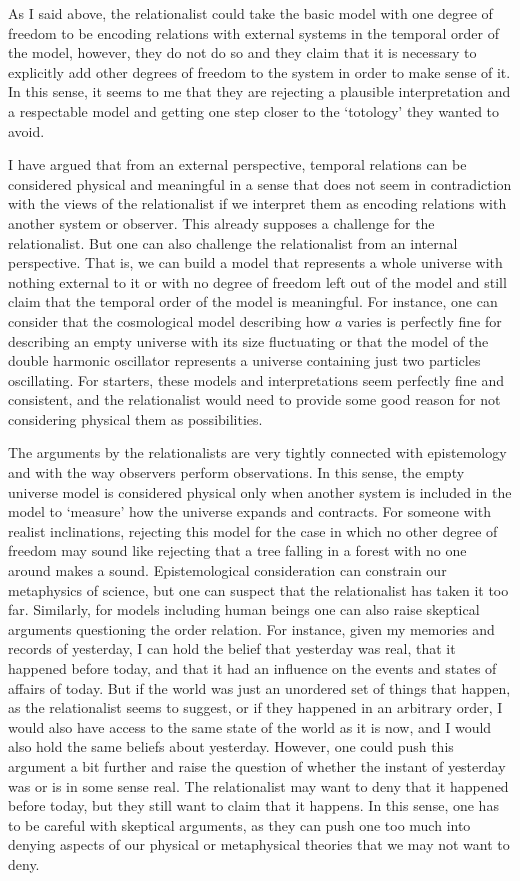 \documentclass[12 pt]{article}
\begin{document}
As I said above, the relationalist could take the basic model with one degree of freedom to be encoding relations with external systems in the temporal order of the model, however, they do not do so and they claim that it is necessary to explicitly add other degrees of freedom to the system in order to make sense of it. In this sense, it seems to me that they are rejecting a plausible interpretation and a respectable model and getting one step closer to the `totology' they wanted to avoid.

I have argued that from an external perspective, temporal relations can be considered physical and meaningful in a sense that does not seem in contradiction with the views of the relationalist if we interpret them as encoding relations with another system or observer. This already supposes a challenge for the relationalist. But one can also challenge the relationalist from an internal perspective. That is, we can build a model that represents a whole universe with nothing external to it or with no degree of freedom left out of the model and still claim that the temporal order of the model is meaningful. For instance, one can consider that the cosmological model describing how $a$ varies is perfectly fine for describing an empty universe with its size fluctuating or that the model of the double harmonic oscillator represents a universe containing just two particles oscillating. For starters, these models and interpretations seem perfectly fine and consistent, and the relationalist would need to provide some good reason for not considering physical them as possibilities.

The arguments by the relationalists are very tightly connected with epistemology and with the way observers perform observations. In this sense, the empty universe model is considered physical only when another system is included in the model to `measure' how the universe expands and contracts. For someone with realist inclinations, rejecting this model for the case in which no other degree of freedom may sound like rejecting that a tree falling in a forest with no one around makes a sound. Epistemological consideration can constrain our metaphysics of science, but one can suspect that the relationalist has taken it too far. Similarly, for models including human beings one can also raise skeptical arguments questioning the order relation. For instance, given my memories and records of yesterday, I can hold the belief that yesterday was real, that it happened before today, and that it had an influence on the events and states of affairs of today. But if the world was just an unordered set of things that happen, as the relationalist seems to suggest, or if they happened in an arbitrary order, I would also have access to the same state of the world as it is now, and I would also hold the same beliefs about yesterday. However, one could push this argument a bit further and raise the question of whether the instant of yesterday was or is in some sense real. The relationalist may want to deny that it happened before today, but they still want to claim that it happens. In this sense, one has to be careful with skeptical arguments, as they can push one too much into denying aspects of our physical or metaphysical theories that we may not want to deny.
\end{document}

